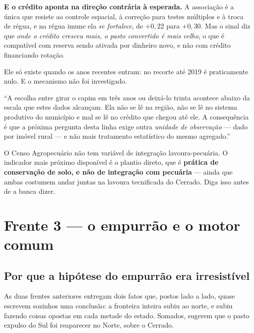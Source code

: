 \textbf{E o crédito aponta na direção contrária à esperada.} A associação é a
única que resiste ao controle espacial, à correção para testes múltiplos e à
troca de régua, e na régua imune ela \emph{se fortalece}, de $+0{,}22$ para
$+0{,}30$. Mas o sinal diz que \emph{onde o crédito cresceu mais, o pasto
convertido é mais velho}, o que é compatível com reserva sendo ativada por
dinheiro novo, e não com crédito financiando rotação.

\begin{naodiz}
Ele só existe quando os anos recentes entram: no recorte até 2019 é
praticamente nulo. E o mecanismo não foi investigado.
\end{naodiz}

\begin{nabanca}
``A escolha entre girar o capim em três anos ou deixá-lo trinta acontece abaixo
da escala que estes dados alcançam. Ela não se lê na região, não se lê no
sistema produtivo do município e mal se lê no crédito que chegou até ele. A
consequência é que a próxima pergunta desta linha exige outra \emph{unidade de
observação} --- dado por imóvel rural --- e não mais tratamento estatístico do
mesmo agregado.''
\end{nabanca}

\begin{armadilha}
O Censo Agropecuário não tem variável de integração lavoura-pecuária. O
indicador mais próximo disponível é o plantio direto, que é \textbf{prática de
conservação de solo, e não de integração com pecuária} --- ainda que ambas
costumem andar juntas na lavoura tecnificada do Cerrado. Diga isso antes de a
banca dizer.
\end{armadilha}

\chapter{Frente 3 --- o empurrão e o motor comum}

\section{Por que a hipótese do empurrão era irresistível}

As duas frentes anteriores entregam dois fatos que, postos lado a lado, quase
escrevem sozinhos uma conclusão: a fronteira inteira subiu ao norte, e subiu
fazendo coisas opostas em cada metade do estado. Somados, sugerem que o pasto
expulso do Sul foi reaparecer no Norte, sobre o Cerrado.

